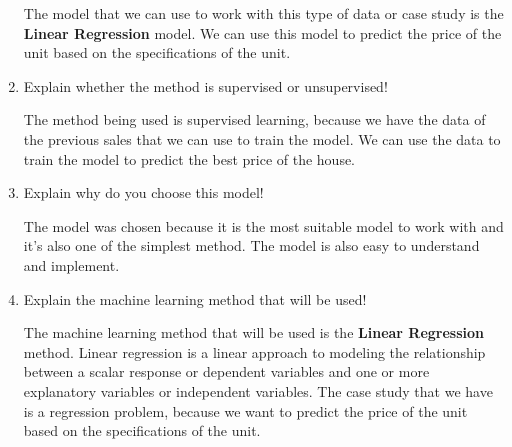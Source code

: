 \documentclass[12pt,titlepage]{article}
\begin{document}
\begin{enumerate}
{        The model that we can use to work with this type of data or case study is the
        \textbf{Linear Regression} model. We can use this model to predict the price of the unit
        based on the specifications of the unit.
    }
    \item {
        Explain whether the method is supervised or unsupervised!

        The method being used is supervised learning, because we have the data of the previous sales
        that we can use to train the model. We can use the data to train the model to predict the best price
        of the house.
    }
    \item {
        Explain why do you choose this model!

        The model was chosen because it is the most suitable model to work with and it's also one of the simplest
        method. The model is also easy to understand and implement.
    }
    \pagebreak
    \item {
        Explain the machine learning method that will be used!

        The machine learning method that will be used is the \textbf{Linear Regression} method.
        Linear regression is a linear approach to modeling the relationship between a scalar response
        or dependent variables and one or more explanatory variables or independent variables.
        The case study that we have is a regression problem, because we want to predict the price of the unit
        based on the specifications of the unit.
    }
\end{enumerate}
\end{document}
